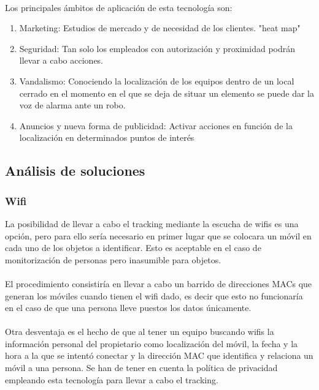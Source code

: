 \documentclass[a4paper ,12pt, onecolumn]{article}
\begin{document}
        \paragraph{}
        Los principales ámbitos de aplicación de esta tecnología son:
        \begin{enumerate}
            \item Marketing: Estudios de mercado y de necesidad de los clientes. "heat map"
            \item Seguridad: Tan solo los empleados con autorización y proximidad podrán llevar a cabo acciones.
            \item Vandalismo: Conociendo la localización de los equipos dentro de un local cerrado en el momento 
            en el que se deja de situar un elemento se puede dar la voz de alarma ante un robo.
            \item Anuncios y nueva forma de publicidad: Activar acciones en función de la localización en determinados puntos de interés
        \end{enumerate}
    \subsection{Análisis de soluciones}
        \subsubsection {Wifi}
        La posibilidad de llevar a cabo el tracking mediante la escucha de wifis es una opción, pero para ello sería
        necesario en primer lugar que se colocara un móvil en cada uno de los objetos a identificar. Esto es aceptable 
        en el caso de monitorización de personas pero inasumible para objetos.
        \paragraph{}
        El procedimiento consistiría en llevar a cabo un barrido de direcciones MACs que generan los móviles cuando tienen el wifi dado,
        es decir que esto no funcionaría en el caso de que una persona lleve puestos los datos únicamente.
        \paragraph{}
        Otra desventaja es el hecho de que al tener un equipo buscando wifis la información personal del propietario como localización del móvil,
        la fecha y la hora a la que se intentó conectar y la dirección MAC que identifica y relaciona un móvil a una persona. Se han de tener 
        en cuenta la política de privacidad empleando esta tecnología para llevar a cabo el tracking.
\end{document}
